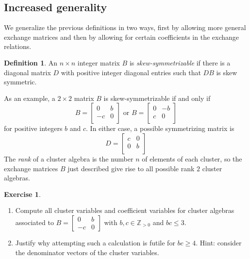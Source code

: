 \documentclass{amsart}
\theoremstyle{definition}
\newtheorem{definition}[theorem]{Definition}
\newtheorem{exercise}[theorem]{Exercise}
\theoremstyle{remark}
\numberwithin{equation}{section}
\newcommand{\ZZ}{{\mathbb{Z}}}
\begin{document}
	\subsection{Increased generality}
	We generalize the previous definitions in two ways, first by allowing more general exchange matrices and then by allowing for certain coefficients in the exchange relations.
	
	\begin{definition}
		An $n \times n$ integer matrix $B$ is \emph{skew-symmetrizable} if there is a diagonal matrix $D$ with positive integer diagonal entries such that $DB$ is skew symmetric.
	\end{definition}
	
	As an example, a $2 \times 2$ matrix $B$ is skew-symmetrizable if and only if
	\begin{displaymath}
		B = \left[ \begin{array}{cc} 	0 & b \\	-c & 0 \\	\end{array}	\right]
		\textrm{ or } B = \left[ \begin{array}{cc} 	0 & -b \\	c & 0 \\	\end{array}	\right]
	\end{displaymath}
	for positive integers $b$ and $c$.  In either case, a possible symmetrizing matrix is
	\begin{displaymath}
		D = \left[ \begin{array}{cc} 	c & 0 \\	0 & b \\	\end{array}	\right]
	\end{displaymath}
	The \emph{rank} of a cluster algebra is the number $n$ of elements of each cluster, so the exchange matrices $B$ just described give rise to all possible rank $2$ cluster algebras.
	
	\begin{exercise}\label{exercise:rank 2}\mbox{}
    \begin{enumerate}
      \item Compute all cluster variables and coefficient variables for cluster algebras associated to $B=\left[\begin{array}{cc} 0 & b\\ -c & 0\end{array}\right]$ with $b,c\in\ZZ_{>0}$ and $bc\le 3$.
      \item Justify why attempting such a calculation is futile for $bc\ge4$.  Hint: consider the denominator vectors of the cluster variables.
    \end{enumerate}
  \end{exercise}
	
\end{document}
